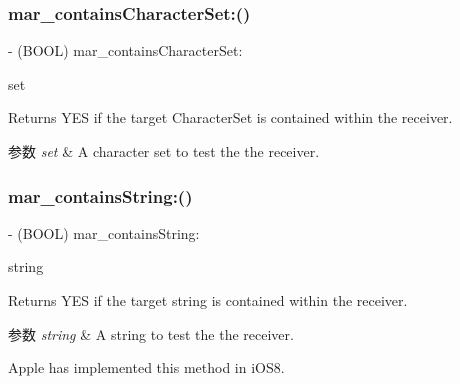\subsubsection{\texorpdfstring{mar\+\_\+contains\+Character\+Set\+:()}{mar\_containsCharacterSet:()}}
{\footnotesize\ttfamily -\/ (B\+O\+OL) mar\+\_\+contains\+Character\+Set\+: \begin{DoxyParamCaption}\item[{(N\+S\+Character\+Set $\ast$)}]{set }\end{DoxyParamCaption}}

Returns Y\+ES if the target Character\+Set is contained within the receiver. 
\begin{DoxyParams}{参数}
{\em set} & A character set to test the the receiver. \\
\hline
\end{DoxyParams}
\mbox{\label{category_n_s_string_07_m_a_r_e_x_08_a9e47a9dc32ece0476965b049eb46ea4a}} 
\subsubsection{\texorpdfstring{mar\+\_\+contains\+String\+:()}{mar\_containsString:()}}
{\footnotesize\ttfamily -\/ (B\+O\+OL) mar\+\_\+contains\+String\+: \begin{DoxyParamCaption}\item[{(N\+S\+String $\ast$)}]{string }\end{DoxyParamCaption}}

Returns Y\+ES if the target string is contained within the receiver. 
\begin{DoxyParams}{参数}
{\em string} & A string to test the the receiver.\\
\hline
\end{DoxyParams}
Apple has implemented this method in i\+O\+S8. \mbox{\label{category_n_s_string_07_m_a_r_e_x_08_a44174c0816e4943e9908ba0d231aac72}} 
